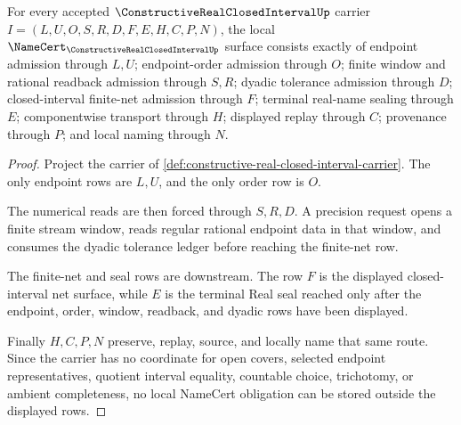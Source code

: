 \begin{theorem}
\label{thm:constructive-real-closed-interval-namecert-obligations}
For every accepted $\ConstructiveRealClosedIntervalUp$ carrier $I=(L,U,O,S,R,D,F,E,H,C,P,N)$, the local $\NameCert_{\ConstructiveRealClosedIntervalUp}$ surface consists exactly of endpoint admission through $L,U$; endpoint-order admission through $O$; finite window and rational readback admission through $S,R$; dyadic tolerance admission through $D$; closed-interval finite-net admission through $F$; terminal real-name sealing through $E$; componentwise transport through $H$; displayed replay through $C$; provenance through $P$; and local naming through $N$.
\end{theorem}
\begin{proof}
Project the carrier of \autoref{def:constructive-real-closed-interval-carrier}. The only endpoint rows are $L,U$, and the only order row is $O$.

The numerical reads are then forced through $S,R,D$. A precision request opens a finite stream window, reads regular rational endpoint data in that window, and consumes the dyadic tolerance ledger before reaching the finite-net row.

The finite-net and seal rows are downstream. The row $F$ is the displayed closed-interval net surface, while $E$ is the terminal Real seal reached only after the endpoint, order, window, readback, and dyadic rows have been displayed.

Finally $H,C,P,N$ preserve, replay, source, and locally name that same route. Since the carrier has no coordinate for open covers, selected endpoint representatives, quotient interval equality, countable choice, trichotomy, or ambient completeness, no local NameCert obligation can be stored outside the displayed rows.
\end{proof}

